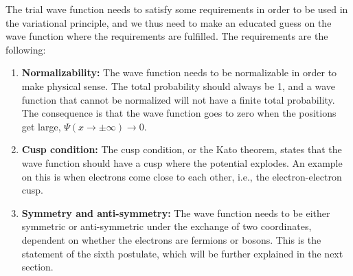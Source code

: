 The trial wave function needs to satisfy some requirements in order to be used in the variational principle, and we thus need to make an educated guess on the wave function where the requirements are fulfilled. The requirements are the following:
\fi

\begin{enumerate}
	\item \textbf{Normalizability:} The wave function needs to be normalizable in order to make physical sense. The total probability should always be 1, and a wave function that cannot be normalized will not have a finite total probability. The consequence is that the wave function goes to zero when the positions get large, $\Psi(x\rightarrow\pm\infty)\rightarrow 0$. 
	
	\item \textbf{Cusp condition:} The cusp condition, or the Kato theorem, states that the wave function should have a cusp where the potential explodes. An example on this is when electrons come close to each other, i.e., the electron-electron cusp.
	
	\item \textbf{Symmetry and anti-symmetry:} The wave function needs to be either symmetric or anti-symmetric under the exchange of two coordinates, dependent on whether the electrons are fermions or bosons. This is the statement of the sixth postulate, which will be further explained in the next section.
\end{enumerate}

